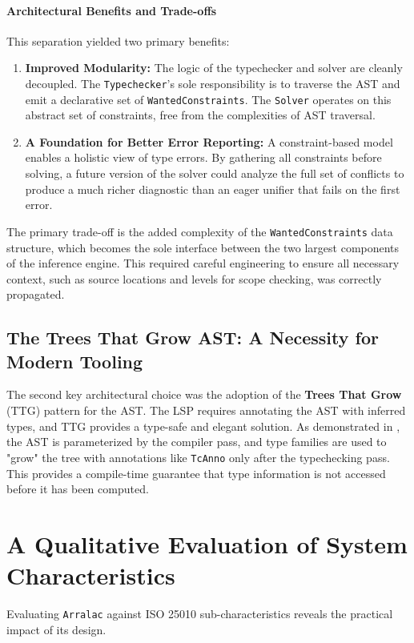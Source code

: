 \paragraph{Architectural Benefits and Trade-offs}
This separation yielded two primary benefits:
\begin{enumerate}
    \item \textbf{Improved Modularity:} The logic of the typechecker and solver are cleanly decoupled. The \texttt{Typechecker}'s sole responsibility is to traverse the AST and emit a declarative set of \texttt{WantedConstraints}. The \texttt{Solver} operates on this abstract set of constraints, free from the complexities of AST traversal.
    \item \textbf{A Foundation for Better Error Reporting:} A constraint-based model enables a holistic view of type errors. By gathering all constraints before solving, a future version of the solver could analyze the full set of conflicts to produce a much richer diagnostic than an eager unifier that fails on the first error.
\end{enumerate}

The primary trade-off is the added complexity of the \texttt{WantedConstraints} data structure, which becomes the sole interface between the two largest components of the inference engine. This required careful engineering to ensure all necessary context, such as source locations and levels for scope checking, was correctly propagated.

\subsection{The Trees That Grow AST: A Necessity for Modern Tooling}
The second key architectural choice was the adoption of the \textbf{Trees That Grow} (TTG) pattern for the AST. The LSP requires annotating the AST with inferred types, and TTG provides a type-safe and elegant solution. As demonstrated in , the AST is parameterized by the compiler pass, and type families are used to "grow" the tree with annotations like \texttt{TcAnno} only after the typechecking pass. This provides a compile-time guarantee that type information is not accessed before it has been computed.

\section{A Qualitative Evaluation of System Characteristics}
\label{sec:Discussion:Characteristics}
Evaluating \texttt{Arralac} against ISO 25010 \cite{iso-25010} sub-characteristics reveals the practical impact of its design.

